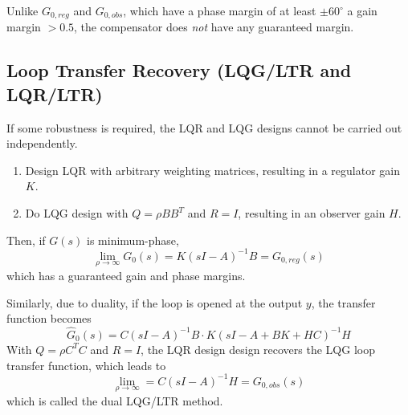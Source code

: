 \vspace{0.5em}
Unlike $G_{0,reg}$ and $G_{0,obs}$, which have a phase margin of at least
$\pm 60^{\circ}$ a gain margin $>0.5$, the compensator does \emph{not} have
any guaranteed margin.

\subsection{Loop Transfer Recovery (LQG/LTR and LQR/LTR)}
If some robustness is required, the LQR and LQG designs cannot be carried out independently.
\begin{enumerate}
    \item Design LQR with arbitrary weighting matrices, resulting in a regulator gain $K$.
    \item Do LQG design with $Q = \rho B B^T$ and $R = I$, resulting in an observer gain $H$.
\end{enumerate}
Then, if $G(s)$ is minimum-phase,
\[
    \lim_{\rho\to\infty} G_0(s) = K(sI - A)^{-1} B = G_{0,reg}(s)
\]
which has a guaranteed gain and phase margins.

Similarly, due to duality, if the loop is opened at the output $y$, the transfer function
becomes
\[
    \hat{G}_0(s) = C(sI-A)^{-1} B \cdot K(sI - A + BK + HC)^{-1} H
\]
With $Q =\rho C^T C$ and $R=I$, the LQR design design recovers the LQG loop transfer function,
which leads to
\[
    \lim_{\rho\to\infty} = C(sI-A)^{-1}H = G_{0,obs}(s)
\]
which is called the dual LQG/LTR method.